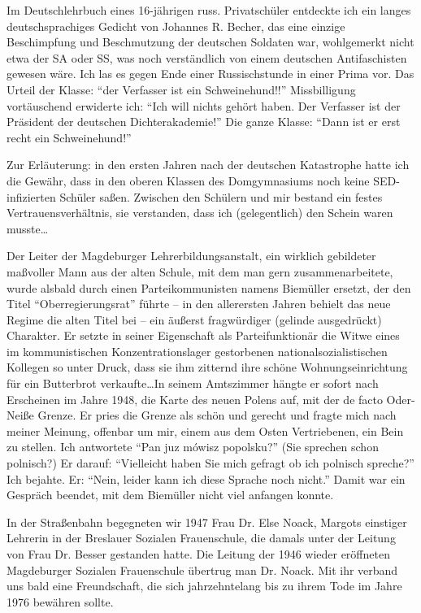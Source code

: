 Im Deutschlehrbuch eines 16-jährigen russ. Privatschüler entdeckte ich ein langes deutschsprachiges Gedicht von Johannes R. Becher, das eine einzige Beschimpfung und Beschmutzung der deutschen Soldaten war, wohlgemerkt nicht etwa der SA oder SS, was noch verständlich von einem deutschen Antifaschisten gewesen wäre. Ich las es gegen Ende einer Russischstunde in einer Prima vor. Das Urteil der Klasse: \enquote{der Verfasser ist ein Schweinehund!!} Missbilligung vortäuschend erwiderte ich: \enquote{Ich will nichts gehört haben. Der Verfasser ist der Präsident der deutschen Dichterakademie!} Die ganze Klasse: \enquote{Dann ist er erst recht ein Schweinehund!}

Zur Erläuterung: in den ersten Jahren nach der deutschen Katastrophe hatte ich die Gewähr, dass in den oberen Klassen des Domgymnasiums noch keine SED-infizierten Schüler saßen. Zwischen den Schülern und mir bestand ein festes Vertrauensverhältnis, sie verstanden, dass ich (gelegentlich) den Schein waren musste\dots

Der Leiter der Magdeburger Lehrerbildungsanstalt, ein wirklich gebildeter maßvoller Mann aus der alten Schule, mit dem man gern zusammenarbeitete, wurde alsbald durch einen Parteikommunisten namens Biemüller ersetzt, der den Titel \enquote{Oberregierungsrat} führte -- in den allerersten Jahren behielt das neue Regime die alten Titel bei -- ein äußerst fragwürdiger (gelinde ausgedrückt) Charakter. Er setzte in seiner Eigenschaft als Parteifunktionär die Witwe eines im kommunistischen Konzentrationslager gestorbenen nationalsozialistischen Kollegen so unter Druck, dass sie ihm zitternd ihre schöne Wohnungseinrichtung für ein Butterbrot verkaufte\dots In seinem Amtszimmer hängte er sofort nach Erscheinen im Jahre 1948, die Karte des neuen Polens auf, mit der de facto Oder-Neiße Grenze. Er pries die Grenze als schön und gerecht und fragte mich nach meiner Meinung, offenbar um mir, einem aus dem Osten Vertriebenen, ein Bein zu stellen. Ich antwortete \enquote{Pan juz mówisz popolsku?} (Sie sprechen schon polnisch?) Er darauf: \enquote{Vielleicht haben Sie mich gefragt ob ich polnisch spreche?} Ich bejahte. Er: \enquote{Nein, leider kann ich diese Sprache noch nicht.} Damit war ein Gespräch beendet, mit dem Biemüller nicht viel anfangen konnte.

In der Straßenbahn begegneten wir 1947 Frau Dr. Else Noack, Margots einstiger Lehrerin in der Breslauer Sozialen Frauenschule, die damals unter der Leitung von Frau Dr. Besser gestanden hatte. Die Leitung der 1946 wieder eröffneten Magdeburger Sozialen Frauenschule übertrug man Dr. Noack. Mit ihr verband uns bald eine Freundschaft, die sich jahrzehntelang bis zu ihrem Tode im Jahre 1976 bewähren sollte.

